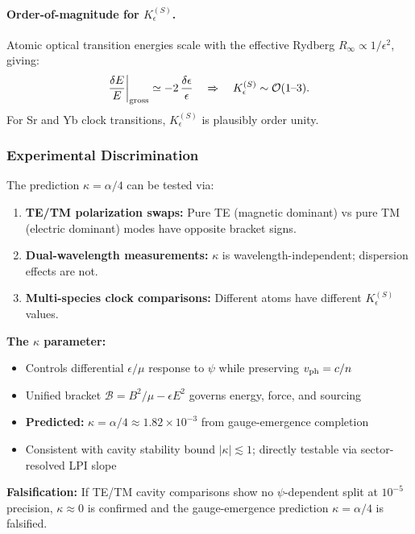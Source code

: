 \paragraph{Order-of-magnitude for $K_\epsilon^{(S)}$.}
Atomic optical transition energies scale with the effective Rydberg $R_\infty \propto 1/\epsilon^2$, giving:
\begin{equation}
\frac{\delta E}{E}\bigg|_{\rm gross} \simeq -2\,\frac{\delta\epsilon}{\epsilon} \quad \Rightarrow \quad K_\epsilon^{(S)} \sim \mathcal{O}(1\text{--}3).
\end{equation}
For Sr and Yb clock transitions, $K_\epsilon^{(S)}$ is plausibly order unity.

\subsubsection{Experimental Discrimination}

The prediction $\kappa = \alpha/4$ can be tested via:
\begin{enumerate}
\item \textbf{TE/TM polarization swaps:} Pure TE (magnetic dominant) vs pure TM (electric dominant) modes have opposite bracket signs.
\item \textbf{Dual-wavelength measurements:} $\kappa$ is wavelength-independent; dispersion effects are not.
\item \textbf{Multi-species clock comparisons:} Different atoms have different $K_\epsilon^{(S)}$ values.
\end{enumerate}

\begin{tcolorbox}[colback=blue!5!white, colframe=blue!50!black, title=Dual-Sector Extension Summary]
\textbf{The $\kappa$ parameter:}
\begin{itemize}[nosep]
\item Controls differential $\epsilon/\mu$ response to $\psi$ while preserving $v_{\rm ph} = c/n$
\item Unified bracket $\mathcal{B} = B^2/\mu - \epsilon E^2$ governs energy, force, and sourcing
\item \textbf{Predicted:} $\kappa = \alpha/4 \approx 1.82\times 10^{-3}$ from gauge-emergence completion
\item Consistent with cavity stability bound $|\kappa| \lesssim 1$; directly testable via sector-resolved LPI slope
\end{itemize}
\textbf{Falsification:} If TE/TM cavity comparisons show no $\psi$-dependent split at $10^{-5}$ precision, $\kappa \approx 0$ is confirmed and the gauge-emergence prediction $\kappa = \alpha/4$ is falsified.
\end{tcolorbox}
